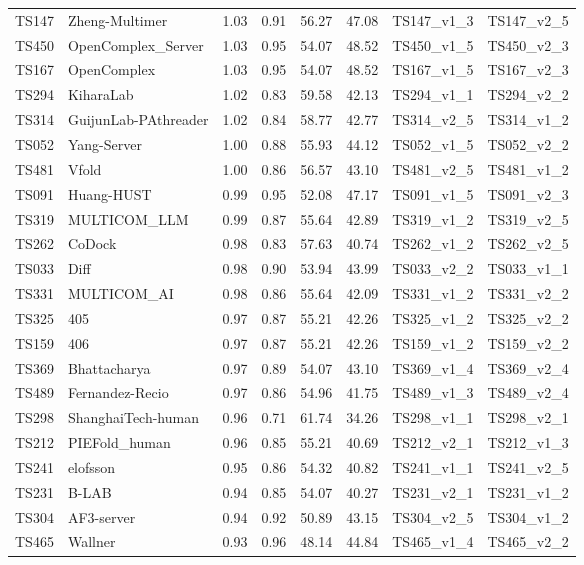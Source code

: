 \begin{longtable}{llllllll}
TS147 & Zheng-Multimer & 1.03 & 0.91 & 56.27 & 47.08 & TS147\_v1\_3 & TS147\_v2\_5 \\ 
TS450 & OpenComplex\_Server & 1.03 & 0.95 & 54.07 & 48.52 & TS450\_v1\_5 & TS450\_v2\_3 \\ 
TS167 & OpenComplex & 1.03 & 0.95 & 54.07 & 48.52 & TS167\_v1\_5 & TS167\_v2\_3 \\ 
TS294 & KiharaLab & 1.02 & 0.83 & 59.58 & 42.13 & TS294\_v1\_1 & TS294\_v2\_2 \\ 
TS314 & GuijunLab-PAthreader & 1.02 & 0.84 & 58.77 & 42.77 & TS314\_v2\_5 & TS314\_v1\_2 \\ 
TS052 & Yang-Server & 1.00 & 0.88 & 55.93 & 44.12 & TS052\_v1\_5 & TS052\_v2\_2 \\ 
TS481 & Vfold & 1.00 & 0.86 & 56.57 & 43.10 & TS481\_v2\_5 & TS481\_v1\_2 \\ 
TS091 & Huang-HUST & 0.99 & 0.95 & 52.08 & 47.17 & TS091\_v1\_5 & TS091\_v2\_3 \\ 
TS319 & MULTICOM\_LLM & 0.99 & 0.87 & 55.64 & 42.89 & TS319\_v1\_2 & TS319\_v2\_5 \\ 
TS262 & CoDock & 0.98 & 0.83 & 57.63 & 40.74 & TS262\_v1\_2 & TS262\_v2\_5 \\ 
TS033 & Diff & 0.98 & 0.90 & 53.94 & 43.99 & TS033\_v2\_2 & TS033\_v1\_1 \\ 
TS331 & MULTICOM\_AI & 0.98 & 0.86 & 55.64 & 42.09 & TS331\_v1\_2 & TS331\_v2\_2 \\ 
TS325 & 405 & 0.97 & 0.87 & 55.21 & 42.26 & TS325\_v1\_2 & TS325\_v2\_2 \\ 
TS159 & 406 & 0.97 & 0.87 & 55.21 & 42.26 & TS159\_v1\_2 & TS159\_v2\_2 \\ 
TS369 & Bhattacharya & 0.97 & 0.89 & 54.07 & 43.10 & TS369\_v1\_4 & TS369\_v2\_4 \\ 
TS489 & Fernandez-Recio & 0.97 & 0.86 & 54.96 & 41.75 & TS489\_v1\_3 & TS489\_v2\_4 \\ 
TS298 & ShanghaiTech-human & 0.96 & 0.71 & 61.74 & 34.26 & TS298\_v1\_1 & TS298\_v2\_1 \\ 
TS212 & PIEFold\_human & 0.96 & 0.85 & 55.21 & 40.69 & TS212\_v2\_1 & TS212\_v1\_3 \\ 
TS241 & elofsson & 0.95 & 0.86 & 54.32 & 40.82 & TS241\_v1\_1 & TS241\_v2\_5 \\ 
TS231 & B-LAB & 0.94 & 0.85 & 54.07 & 40.27 & TS231\_v2\_1 & TS231\_v1\_2 \\ 
TS304 & AF3-server & 0.94 & 0.92 & 50.89 & 43.15 & TS304\_v2\_5 & TS304\_v1\_2 \\ 
TS465 & Wallner & 0.93 & 0.96 & 48.14 & 44.84 & TS465\_v1\_4 & TS465\_v2\_2 \\ 

\end{longtable}
